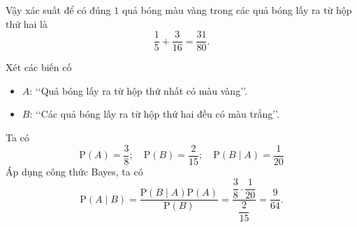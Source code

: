 \begin{bt}
{\begin{enumEX}[\hspace*{.5cm}a)]{1}
\begin{center}
\begin{tikzpicture}[scale=0.7, line join=round, line cap=round, >=stealth]
	\end{tikzpicture}
	\end{center}
	Vậy xác suất để có đúng $1$ quả bóng màu vàng trong các quả bóng lấy ra từ hộp thứ hai là $$ \dfrac{1}{5} + \dfrac{3}{16}=\dfrac{31}{80}.$$
	\item Xét các biến cố
	\begin{itemize}
	\item $A$: \lq\lq  Quả bóng lấy ra từ hộp thứ nhất có màu vàng\rq\rq.
	\item $B$: \lq\lq  Các quả bóng lấy ra từ hộp thứ hai đều có màu trắng\rq\rq.
	\end{itemize}
	Ta có
	\[\mathrm{P}(A) = \dfrac{3}{8};\quad
	\mathrm{P}(B) = \dfrac{2}{15};\quad
	\mathrm{P}(B\mid A) = \dfrac{1}{20} \]
	Áp dụng công thức Bayes, ta có
	\[
	\mathrm{P} (A \mid B)=\dfrac{\mathrm{P} (B \mid A) \mathrm{P} (A)}{\mathrm{P} (B)}=\dfrac{\dfrac{3}{8} \cdot \dfrac{1}{20}}{\dfrac{2}{15}} =\dfrac{9}{64}.\]
	\end{enumEX}
}\end{bt}

